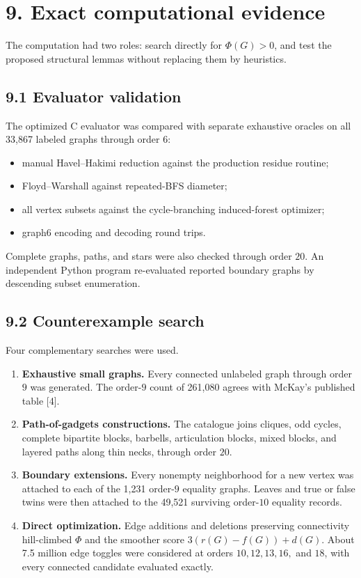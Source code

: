\documentclass[
  11pt,
  letterpaper,
]{article}
\newcounter{none} %
\providecommand{\tightlist}{%
  \setlength{\itemsep}{0pt}\setlength{\parskip}{0pt}}
\begin{document}
\section{9. Exact computational
evidence}\label{exact-computational-evidence}

The computation had two roles: search directly for \(\Phi(G)>0\), and
test the proposed structural lemmas without replacing them by
heuristics.

\subsection{9.1 Evaluator validation}\label{evaluator-validation}

The optimized C evaluator was compared with separate exhaustive oracles
on all 33,867 labeled graphs through order \(6\):

\begin{itemize}
\tightlist
\item
  manual Havel--Hakimi reduction against the production residue routine;
\item
  Floyd--Warshall against repeated-BFS diameter;
\item
  all vertex subsets against the cycle-branching induced-forest
  optimizer;
\item
  graph6 encoding and decoding round trips.
\end{itemize}

Complete graphs, paths, and stars were also checked through order
\(20\). An independent Python program re-evaluated reported boundary
graphs by descending subset enumeration.

\subsection{9.2 Counterexample search}\label{counterexample-search}

Four complementary searches were used.

\begin{enumerate}
\def\labelenumi{\arabic{enumi}.}
\tightlist
\item
  \textbf{Exhaustive small graphs.} Every connected unlabeled graph
  through order \(9\) was generated. The order-\(9\) count of 261,080
  agrees with McKay's published table {[}4{]}.
\item
  \textbf{Path-of-gadgets constructions.} The catalogue joins cliques,
  odd cycles, complete bipartite blocks, barbells, articulation blocks,
  mixed blocks, and layered paths along thin necks, through order
  \(20\).
\item
  \textbf{Boundary extensions.} Every nonempty neighborhood for a new
  vertex was attached to each of the 1,231 order-\(9\) equality graphs.
  Leaves and true or false twins were then attached to the 49,521
  surviving order-\(10\) equality records.
\item
  \textbf{Direct optimization.} Edge additions and deletions preserving
  connectivity hill-climbed \(\Phi\) and the smoother score
  \(3(r(G)-f(G))+d(G)\). About 7.5 million edge toggles were considered
  at orders \(10,12,13,16,\) and \(18\), with every connected candidate
  evaluated exactly.
\end{enumerate}
\end{document}

